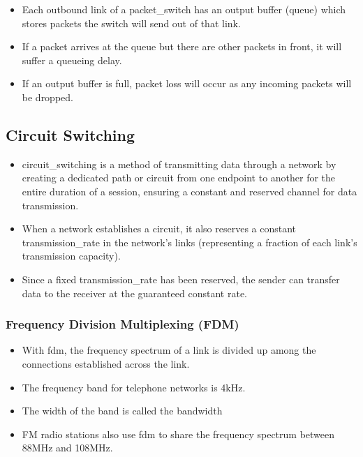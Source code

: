 \documentclass{article}
\begin{document}
\begin{itemize}
    \item Each outbound link of a \gls*{packet_switch} has an output buffer (queue) which stores packets the switch will send out of that link.
    \item If a packet arrives at the queue but there are other packets in front, it will suffer a queueing delay.
    \item If an output buffer is full, packet loss will occur as any incoming packets will be dropped.
\end{itemize}

\subsection{Circuit Switching}

\begin{itemize}
    \item \Gls{circuit_switching} is a method of transmitting data through a network by creating a dedicated path or circuit from one endpoint to another for the entire duration of a session, ensuring a constant and reserved channel for data transmission.
    \item When a network establishes a circuit, it also reserves a constant \gls*{transmission_rate} in the network's links (representing a fraction of each link's transmission capacity).
    \item Since a fixed \gls*{transmission_rate} has been reserved, the sender can transfer data to the receiver at the guaranteed constant rate.
\end{itemize}

\subsubsection{Frequency Division Multiplexing (FDM)}

\begin{itemize}
    \item With \gls{fdm}, the frequency spectrum of a link is divided up among the connections established across the link.
    \item The frequency band for telephone networks is 4kHz.
    \item The width of the band is called the bandwidth
    \item FM radio stations also use \gls*{fdm} to share the frequency spectrum between 88MHz and 108MHz.
\end{itemize}
\end{document}
